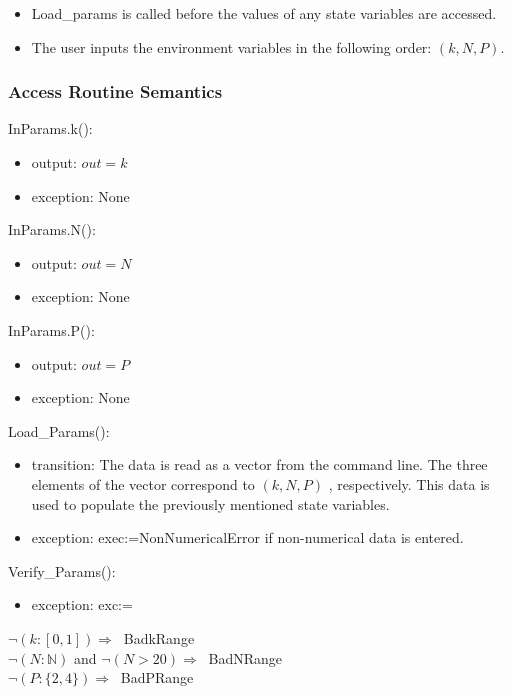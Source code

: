 \documentclass[12pt, titlepage]{article}
\begin{document}
\begin{itemize}
	\item Load\_params is called before the values of any state variables are 
	accessed.
	\item The user inputs the environment variables in the following order: 
	$(k,N,P)$.
\end{itemize}

\subsubsection{Access Routine Semantics}

\noindent InParams.k():
\begin{itemize}
\item output: $out = k$
\item exception: None
\end{itemize}

\noindent InParams.N():
\begin{itemize}
	\item output: $out = N$
	\item exception: None
\end{itemize}

\noindent InParams.P():
\begin{itemize}
	\item output: $out = P$
	\item exception: None
\end{itemize}

\noindent Load\_Params():
\begin{itemize}
	\item transition: The data is read as a vector from the command line. The 
	three elements of the vector correspond to $(k,N,P)$ , respectively. This 
	data is used to populate the 
	previously mentioned state variables. 
	\item exception: exec:=NonNumericalError if non-numerical data is entered. 
\end{itemize} 

\noindent Verify\_Params():
\begin{itemize}
	\item exception: exc:=
\end{itemize}  

\noindent 
$\neg (k : [0,1]) \Rightarrow \ $ BadkRange\\
$\neg (N : \mathbb{N})$ and $\neg(N>20) \Rightarrow \ $ BadNRange\\
$\neg (P : \{2,4\} ) \Rightarrow \ $ BadPRange
\end{document}
